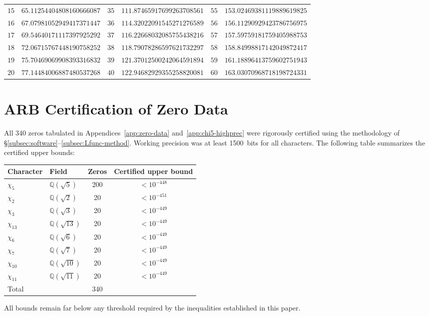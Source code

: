 \documentclass[12pt,reqno]{amsart}
\theoremstyle{plain}
\theoremstyle{definition}
\theoremstyle{remark}
\newcommand{\Q}{\mathbb{Q}}
\begin{document}
\begin{longtable}{cl|cl|cl}
$15$ & $65.11254404808160666087$ & $35$ & $111.87465917699263708561$ & $55$ & $153.02469381119889619825$ \\
$16$ & $67.07981052949417371447$ & $36$ & $114.32022091545271276589$ & $56$ & $156.11290929423786756975$ \\
$17$ & $69.54640171117397925292$ & $37$ & $116.22668032085755438216$ & $57$ & $157.59759181759405988753$ \\
$18$ & $72.06715767448190758252$ & $38$ & $118.79078286597621732297$ & $58$ & $158.84998817142049872417$ \\
$19$ & $75.70469069908393316832$ & $39$ & $121.37012500242064591894$ & $59$ & $161.18896413759602751943$ \\
$20$ & $77.14484006887480537268$ & $40$ & $122.94682929355258820081$ & $60$ & $163.03070968718198724331$ \\

\end{longtable}
\normalsize



\section{ARB Certification of Zero Data}\label{app:certification}

All 340 zeros tabulated in Appendices~\ref{app:zero-data} and~\ref{app:chi5-highprec} were rigorously certified using the methodology of \S\ref{subsec:software}--\ref{subsec:Lfunc-method}.  Working precision was at least 1500~bits for all characters.  The following table summarizes the certified upper bounds:

\renewcommand{\arraystretch}{1.15}
\small
\setlength{\LTleft}{\fill}
\setlength{\LTright}{\fill}
\begin{longtable}{llcc}
\toprule
Character & Field & Zeros & Certified upper bound \\
\midrule
\endhead
$\chi_5$   & $\Q(\sqrt{5})$   & 200 & $< 10^{-448}$ \\
$\chi_2$   & $\Q(\sqrt{2})$   &  20 & $< 10^{-451}$ \\
$\chi_3$   & $\Q(\sqrt{3})$   &  20 & $< 10^{-449}$ \\
$\chi_{13}$ & $\Q(\sqrt{13})$ &  20 & $< 10^{-449}$ \\
$\chi_6$   & $\Q(\sqrt{6})$   &  20 & $< 10^{-449}$ \\
$\chi_7$   & $\Q(\sqrt{7})$   &  20 & $< 10^{-449}$ \\
$\chi_{10}$ & $\Q(\sqrt{10})$ &  20 & $< 10^{-449}$ \\
$\chi_{11}$ & $\Q(\sqrt{11})$ &  20 & $< 10^{-449}$ \\
\midrule
Total & & 340 & \\
\bottomrule
\end{longtable}
\setlength{\LTleft}{0pt}
\setlength{\LTright}{0pt}
\normalsize
\noindent All bounds remain far below any threshold required by the inequalities established in this paper.
\end{document}
